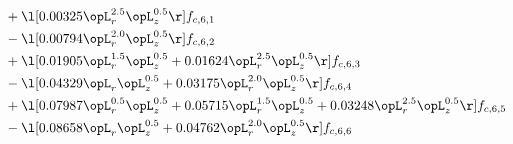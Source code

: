 \begin{alignat}{2}
& + \l[  0.00325 \opL_r^{2.5} \opL_z^{0.5}  \r] f_{c,6,1} \nonumber \\ 
& - \l[  0.00794 \opL_r^{2.0} \opL_z^{0.5}  \r] f_{c,6,2} \nonumber \\ 
& + \l[  0.01905 \opL_r^{1.5} \opL_z^{0.5} +  0.01624 \opL_r^{2.5} \opL_z^{0.5}  \r] f_{c,6,3} \nonumber \\ 
& - \l[  0.04329 \opL_r \opL_z^{0.5} +  0.03175 \opL_r^{2.0} \opL_z^{0.5}  \r] f_{c,6,4} \nonumber \\ 
& + \l[  0.07987 \opL_r^{0.5} \opL_z^{0.5} +  0.05715 \opL_r^{1.5} \opL_z^{0.5} +  0.03248 \opL_r^{2.5} \opL_z^{0.5}  \r] f_{c,6,5} \nonumber \\ 
& - \l[  0.08658 \opL_r \opL_z^{0.5} +  0.04762 \opL_r^{2.0} \opL_z^{0.5}  \r] f_{c,6,6} \nonumber \\ 
\end{alignat} 


